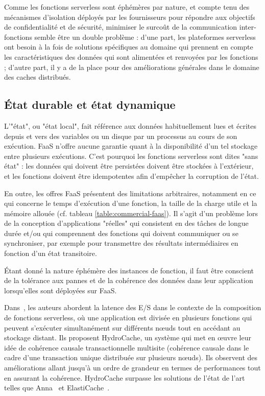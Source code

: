 Comme les fonctions serverless sont éphémères par nature, et compte tenu des mécanismes d'isolation déployés par les fournisseurs pour répondre aux objectifs de confidentialité et de sécurité, minimiser le surcoût de la communication inter-fonctions semble être un double problème : d'une part, les plateformes serverless ont besoin à la fois de solutions spécifiques au domaine qui prennent en compte les caractéristiques des données qui sont alimentées et renvoyées par les fonctions ; d'autre part, il y a de la place pour des améliorations générales dans le domaine des caches distribués.

\subsection{État durable et état dynamique} \label{sota-state}

L'"état", ou "état local", fait référence aux données habituellement lues et écrites depuis et vers des variables ou un disque par un processus au cours de son exécution. FaaS n'offre aucune garantie quant à la disponibilité d'un tel stockage entre plusieurs exécutions. C'est pourquoi les fonctions serverless sont dites "sans état" : les données qui doivent être persistées doivent être stockées à l'extérieur, et les fonctions doivent être idempotentes afin d'empêcher la corruption de l'état.

En outre, les offres FaaS présentent des limitations arbitraires, notamment en ce qui concerne le temps d'exécution d'une fonction, la taille de la charge utile et la mémoire allouée (cf. tableau \ref{table:commercial-faas}). Il s'agit d'un problème lors de la conception d'applications "réelles" qui consistent en des tâches de longue durée et/ou qui comprennent des fonctions qui doivent communiquer ou se synchroniser, par exemple pour transmettre des résultats intermédiaires en fonction d'un état transitoire.

Étant donné la nature éphémère des instances de fonction, il faut être conscient de la tolérance aux pannes et de la cohérence des données dans leur application lorsqu'elles sont déployées sur FaaS.

Dans~\cite{wuTransactionalCausalConsistency2020}, les auteurs abordent la latence des E/S dans le contexte de la composition de fonctions serverless, où une application est divisée en plusieurs fonctions qui peuvent s'exécuter simultanément sur différents nœuds tout en accédant au stockage distant. Ils proposent HydroCache, un système qui met en œuvre leur idée de cohérence causale transactionnelle multisite (cohérence causale dans le cadre d'une transaction unique distribuée sur plusieurs nœuds). Ils observent des améliorations allant jusqu'à un ordre de grandeur en termes de performances tout en assurant la cohérence. HydroCache surpasse les solutions de l'état de l'art telles que Anna~\cite{Wu2018AnnaAK} et ElastiCache~\cite{elasticache}.

